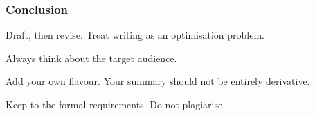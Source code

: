 \documentclass[xetex]{beamer}
\begin{document}
\begin{frame}
  \frametitle{Conclusion}

  Draft, then revise. Treat writing as an optimisation problem.

  \medskip
  \pause

  Always think about the target audience.

  \medskip
  \pause

  Add your own flavour. Your summary should not be entirely derivative.

  \medskip
  \pause

  Keep to the formal requirements. Do not plagiarise.
\end{frame}
\end{document}
